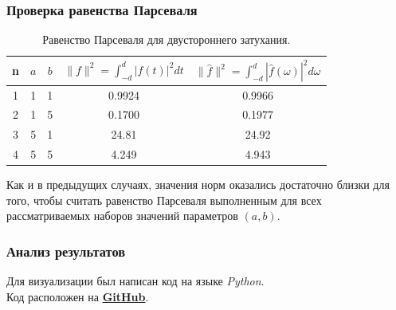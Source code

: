 \documentclass[a5paper, 10pt]{article}
\theoremstyle{definition}
\theoremstyle{plain}
\theoremstyle{remark}
\begin{document}
\subsubsection{Проверка равенства Парсеваля}

\begin{table}[h!]
\caption{Равенство Парсеваля для двустороннего затухания.}
\label{tabular:timesandtenses}
\begin{center}
\begin{tabular}{|c|c|c|c|c|}
\hline
n & $a$ & $b$ & $\| f \|^2 = \int_{-d}^d |f(t)|^2 dt $ & $\| \hat{f} \|^2 = \int_{-d}^d |\hat{f}(\omega)|^2 d\omega $ \\
\hline
1 & 1 & 1 &  0.9924& 0.9966\\
\hline
2 & 1 & 5 & 0.1700 & 0.1977\\
\hline
3 & 5 & 1 & 24.81 & 24.92 \\
\hline
4 & 5 & 5 & 4.249  & 4.943 \\
\hline
\end{tabular}
\end{center}
\end{table}

Как и в предыдущих случаях, значения норм оказались достаточно близки для того, чтобы считать равенство Парсеваля выполненным для всех рассматриваемых наборов значений параметров $(a, b)$.


\newpage
\subsubsection{Анализ результатов}




Для визуализации был написан код на языке \textit{Python}. \\
Код расположен на \href{https://github.com/a-nechaeva/practical_Linal/tree/main/lab4}{\textbf{GitHub}}.
\end{document}
